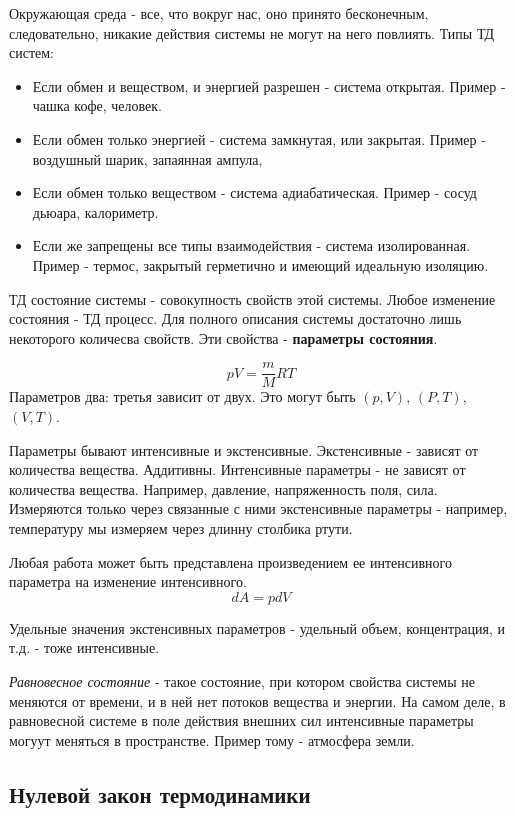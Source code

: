 \documentclass[11pt]{article}
\begin{document}
Окружающая среда - все, что вокруг нас, оно принято бесконечным, следовательно, никакие действия системы не могут на него повлиять.
Типы ТД систем:
\begin{itemize}
\item Если обмен и веществом,  и энергией разрешен - система открытая. Пример - чашка кофе, человек.

\item Если обмен только энергией - система замкнутая, или закрытая. Пример - воздушный шарик, запаянная ампула,

\item Если обмен только веществом - система адиабатическая. Пример - сосуд дьюара, калориметр.

\item Если же запрещены все типы взаимодействия - система изолированная. Пример - термос, закрытый герметично и имеющий идеальную изоляцию.
\end{itemize}
ТД состояние системы - совокупность свойств этой системы. Любое изменение состояния - ТД процесс. Для полного описания системы достаточно лишь некоторого количесва свойств. Эти свойства - \textbf{параметры состояния}.

$$pV = \frac{m}{M}RT$$
Параметров два: третья зависит от двух. Это могут быть $(p,V)$, $(P, T)$, $(V, T)$.

Параметры бывают интенсивные и экстенсивные. Экстенсивные - зависят от количества вещества. Аддитивны. Интенсивные параметры - не зависят от количества вещества. Например, давление, напряженность поля, сила. Измеряются только через связанные с ними экстенсивные параметры - например, температуру мы измеряем через длинну столбика ртути.

Любая работа может быть представлена произведением ее интенсивного параметра на изменение интенсивного. $$dA = pdV$$

Удельные значения экстенсивных параметров - удельный объем, концентрация, и т.д. - тоже интенсивные. 

\emph{Равновесное состояние } - такое состояние, при котором свойства системы не меняются от времени, и в ней нет потоков вещества и энергии. На самом деле, в равновесной системе в поле действия внешних сил интенсивные параметры могуут меняться в пространстве. Пример тому - атмосфера земли.

\subsection{Нулевой закон термодинамики}
\end{document}
